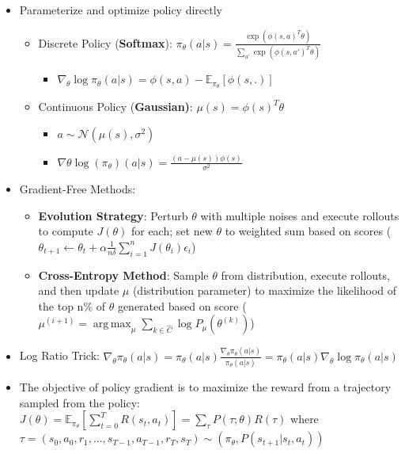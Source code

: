 \documentclass[twocolumn]{article}
\providecommand{\tightlist}{%
  \setlength{\itemsep}{\GlobalItemSep}\setlength{\parskip}{\GlobalListParSkip}}
\newlength{\GlobalItemSep}
\newlength{\GlobalListParSkip}
\DeclareMathOperator*{\argmax}{arg\,max}
\begin{document}
\begin{itemize}
\tightlist
\item
  Parameterize and optimize policy directly

  \begin{itemize}
  \tightlist
  \item
    Discrete Policy (\textbf{Softmax}):
    \(\pi_\theta (a | s) = \frac{\exp (\phi(s, a)^{T} \theta)}{\sum_{a'} \exp (\phi(s, a')^T \theta)}\)

    \begin{itemize}
    \tightlist
    \item
      \(\nabla_\theta \log \pi_\theta (a|s) = \phi(s,a) - \mathbb{E}_{\pi_\theta}[\phi(s, .)]\)
    \end{itemize}
  \item
    Continuous Policy (\textbf{Gaussian)}:
    \(\mu (s) = \phi(s)^T \theta\)

    \begin{itemize}
    \tightlist
    \item
      \(a \sim \mathcal{N} (\mu (s), \sigma^2)\)
    \item
      \(\nabla \theta \log(\pi_\theta) (a |s) = \frac{(a - \mu(s)) \phi(s)}{\sigma^2}\)
    \end{itemize}
  \end{itemize}
\item
  Gradient-Free Methods:

  \begin{itemize}
  \tightlist
  \item
    \textbf{Evolution Strategy}: Perturb \(\theta\) with multiple noises
    and execute rollouts to compute \(J(\theta)\) for each; set new
    \(\theta\) to weighted sum based on scores
    (\(\theta_{t+1} \leftarrow \theta_t + \alpha \frac{1}{n \delta} \sum_{i=1}^n J(\theta_i) \epsilon_i\))
  \item
    \textbf{Cross-Entropy Method}: Sample \(\theta\) from distribution,
    execute rollouts, and then update \(\mu\) (distribution parameter)
    to maximize the likelihood of the top n\% of \(\theta\) generated
    based on score
    (\(\mu^{(i+1)} = \argmax_\mu \sum_{k \in \hat{C}} \log P_\mu (\theta^{(k)})\))
  \end{itemize}
\item
  Log Ratio Trick:
  \(\nabla_\theta \pi_\theta (a|s) = \pi_\theta (a|s) \frac{\nabla_\theta \pi_\theta (a|s)}{\pi_\theta (a|s)} = \pi_\theta (a|s) \nabla_\theta \log \pi_\theta (a|s)\)
\item
  The objective of policy gradient is to maximize the reward from a
  trajectory sampled from the policy:
  \(J(\theta) = \mathbb{E}_{\pi_\theta}[\sum_{t=0}^T R(s_t, a_t)] = \sum_\tau P(\tau ; \theta) R(\tau)\)
  where
  \(\tau = (s_0, a_0, r_1, ..., s_{T-1}, a_{T-1}, r_T, s_T) \sim (\pi_\theta, P(s_{t+1} | s_t, a_t))\)


\end{itemize}
\end{document}
